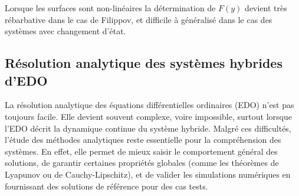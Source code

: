 \documentclass[12pt, oneside]{report} %
\theoremstyle{definition}
\newtheorem{exam}{\textbf{Exemple}}[section]
\theoremstyle{remark}
\begin{document}
%		
Lorsque les surfaces sont non-linéaires la détermination de $F(y)$ devient très rébarbative dans le cas de Filippov, et difficile à généralisé dans le cas des systèmes avec changement d'état. 

	\subsection{Résolution analytique des systèmes hybrides d'EDO }
La résolution analytique des équations différentielles ordinaires (EDO) n’est pas toujours facile. Elle devient souvent complexe, voire impossible, surtout lorsque l’EDO décrit la dynamique continue du système hybride.  
Malgré ces difficultés, l’étude des méthodes analytiques reste essentielle pour la compréhension des systèmes. En effet, elle permet de mieux saisir le comportement général des solutions, de garantir certaines propriétés globales (comme les théorèmes de Lyapunov ou de Cauchy-Lipschitz), et de valider les simulations numériques en fournissant des solutions de référence pour des cas tests.
\end{document}
